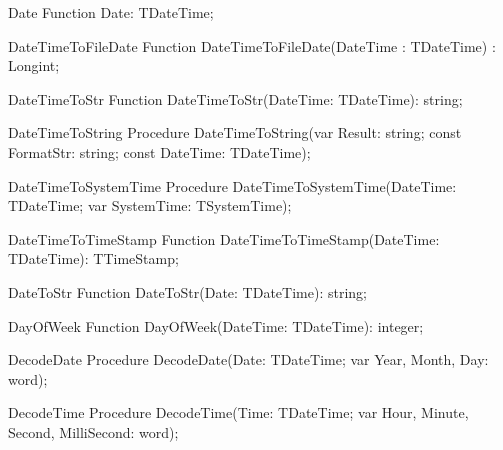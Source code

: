\begin{function}{Date}
\Declaration
Function Date: TDateTime;
\Description
\Errors
\SeeAlso
\end{function}

 
\begin{function}{DateTimeToFileDate}
\Declaration
Function DateTimeToFileDate(DateTime : TDateTime) : Longint;
\Description
\Errors
\SeeAlso
\end{function}

 
\begin{function}{DateTimeToStr}
\Declaration
Function DateTimeToStr(DateTime: TDateTime): string;
\Description
\Errors
\SeeAlso
\end{function}

 
\begin{procedure}{DateTimeToString}
\Declaration
Procedure DateTimeToString(var Result: string; const FormatStr: string; const DateTime: TDateTime);
\Description
\Errors
\SeeAlso
\end{procedure}

 
\begin{procedure}{DateTimeToSystemTime}
\Declaration
Procedure DateTimeToSystemTime(DateTime: TDateTime; var SystemTime: TSystemTime);
\Description
\Errors
\SeeAlso
\end{procedure}

 
\begin{function}{DateTimeToTimeStamp}
\Declaration
Function DateTimeToTimeStamp(DateTime: TDateTime): TTimeStamp;
\Description
\Errors
\SeeAlso
\end{function}

 
\begin{function}{DateToStr}
\Declaration
Function DateToStr(Date: TDateTime): string;
\Description
\Errors
\SeeAlso
\end{function}

 
\begin{function}{DayOfWeek}
\Declaration
Function DayOfWeek(DateTime: TDateTime): integer;
\Description
\Errors
\SeeAlso
\end{function}

 
\begin{procedure}{DecodeDate}
\Declaration
Procedure DecodeDate(Date: TDateTime; var Year, Month, Day: word);
\Description
\Errors
\SeeAlso
\end{procedure}

 
\begin{procedure}{DecodeTime}
\Declaration
Procedure DecodeTime(Time: TDateTime; var Hour, Minute, Second, MilliSecond: word);
\Description
\Errors
\SeeAlso
\end{procedure}

